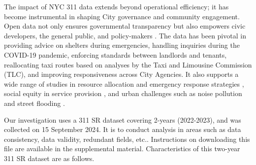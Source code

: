 \documentclass[linenumber]{jdsart}
\begin{document}
The impact of NYC 311 data extends beyond operational efficiency; it
has become instrumental in shaping City governance and community
engagement. Open data not only ensures governmental transparency
but also empowers civic developers, the general public, and
policy-makers \citep{minkoff2016nyc, o2017uncharted,
  kontokosta2021bias}.
The data has been pivotal in providing advice on shelters
during emergencies, handling inquiries during the COVID-19 pandemic,
enforcing standards between landlords and tenants, reallocating taxi
routes based on analyses by the Taxi and Limousine Commission (TLC),
and improving responsiveness across City Agencies.
It also supports a wide range of studies in resource allocation and
emergency response strategies \citep{zha2014profiling, raj2021swift},
social equity in service provision \citep{white2018promises,
  kontokosta2021bias}, and urban challenges such as noise pollution
\citep{dove2022sounds} and street flooding
\citep{agonafir2022understanding}.


Our investigation uses a 311 SR dataset covering  2-years (2022-2023), 
and was collected on 15 September 2024. It is to conduct 
analysis in areas such as data consistency, data validity, 
redundant fields, etc.. Instructions on downloading this file are 
available in the supplemental material. Characteristics of this
two-year 311 SR dataset are as follows.
\end{document}
